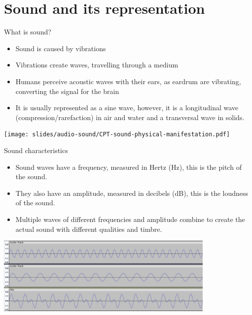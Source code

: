\section{Sound and its representation}

\begin{frame}{What is sound?}
  \begin{itemize}
  \item Sound is caused by vibrations
  \item Vibrations create waves, travelling through a medium
  \item Humans perceive acoustic waves with their ears, as eardrum are
    vibrating, converting the signal for the brain
  \item It is usually represented as a sine wave, however, it is a
    longitudinal wave (compression/rarefaction) in air and water and a
    transversal wave in solids.
  \end{itemize}
  \begin{center}
  \texttt{[image: slides/audio-sound/CPT-sound-physical-manifestation.pdf]}
  \end{center}
\end{frame}

\begin{frame}{Sound characteristics}
  \begin{itemize}
  \item Sound waves have a frequency, measured in Hertz (Hz), this is
    the pitch of the sound.
  \item They also have an amplitude, measured in decibels (dB), this
    is the loudness of the sound.
  \item Multiple waves of different frequencies and amplitude combine
    to create the actual sound with different qualities and timbre.
  \end{itemize}
  \begin{center}
  \includegraphics[width=0.8\textwidth]{slides/audio-sound/sound-compose.png}
  \end{center}
\end{frame}

